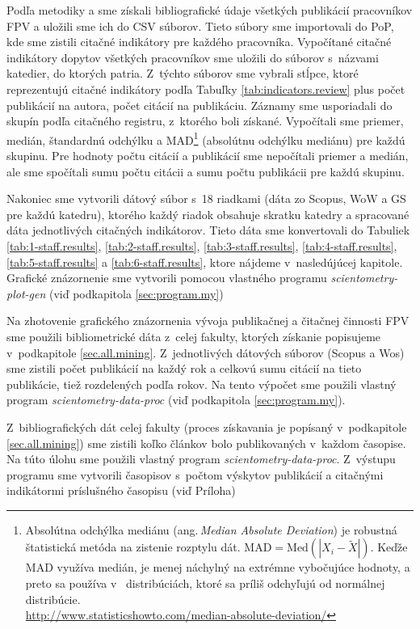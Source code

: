 Podľa metodiky \citet{Kazakis2014a} a \citet{Kazakis2014b,Kazakis2015} sme
získali bibliografické údaje všetkých publikácií pracovníkov FPV a uložili sme
ich do CSV súborov. Tieto súbory sme importovali do PoP, kde sme zistili citačné
indikátory pre každého pracovníka. Vypočítané citačné indikátory dopytov
všetkých pracovníkov sme uložili do súborov s~názvami katedier, do ktorých
patria. Z~týchto súborov sme vybrali stĺpce, ktoré reprezentujú citačné
indikátory podľa Tabuľky \ref{tab:indicators.review} plus počet publikácií na
autora, počet citácií na publikáciu.  Záznamy sme usporiadali do skupín podľa
citačného registru, z~ktorého boli získané.  Vypočítali sme priemer, medián,
štandardnú odchýlku a MAD\footnote{Absolútna odchýlka mediánu
  (ang.\,\emph{Median Absolute Deviation}) je robustná štatistická metóda na
  zistenie rozptylu dát.  $\mathrm{MAD} = \mathrm{Med}(|X_i - \tilde{X}|)$.
  Keďže MAD využíva medián, je menej náchylný na extrémne vybočujúce hodnoty, a
  preto sa používa v~ distribúciách, ktoré sa príliš odchyľujú od normálnej
  distribúcie.\\\url{http://www.statisticshowto.com/median-absolute-deviation/}}
(absolútnu odchýlku mediánu) pre každú skupinu. Pre hodnoty počtu citácií a
publikácií sme nepočítali priemer a medián, ale sme spočítali sumu počtu citácii
a sumu počtu publikácii pre každú skupinu.

Nakoniec sme vytvorili dátový súbor s~18 riadkami (dáta zo Scopus, WoW a GS pre
každú katedru), ktorého každý riadok obsahuje skratku katedry a spracované dáta
jednotlivých citačných indikátorov.  Tieto dáta sme konvertovali do Tabuliek
\ref{tab:1-staff.results}, \ref{tab:2-staff.results}, \ref{tab:3-staff.results},
\ref{tab:4-staff.results}, \ref{tab:5-staff.results} a
\ref{tab:6-staff.results}, ktore nájdeme v~nasledújúcej kapitole. Grafické
znázornenie sme vytvorili pomocou vlastného programu
\emph{scientometry-plot-gen} (viď podkapitola \ref{sec:program.my})

Na zhotovenie grafického znázornenia vývoja publikačnej a čitačnej činnosti FPV
sme použili bibliometrické dáta z~celej fakulty, ktorých získanie popisujeme
v~podkapitole \ref{sec.all.mining}. Z~jednotlivých dátových súborov (Scopus a
Wos) sme zistili počet publikácií na každý rok a celkovú sumu citácií na tieto
publikácie, tiež rozdelených podľa rokov. Na tento výpočet sme použili vlastný
program \emph{scientometry-data-proc} (viď podkapitola \ref{sec:program.my}).

Z~bibliografických dát celej fakulty (proces získavania je popísaný
v~podkapitole \ref{sec.all.mining}) sme zistili koľko článkov bolo publikovaných
v~každom časopise.  Na túto úlohu sme použili vlastný program
\emph{scientometry-data-proc}. Z~výstupu programu sme vytvorili časopisov
s~počtom výskytov publikácií a citačnými indikátormi príslušného časopisu (viď
Príloha)

